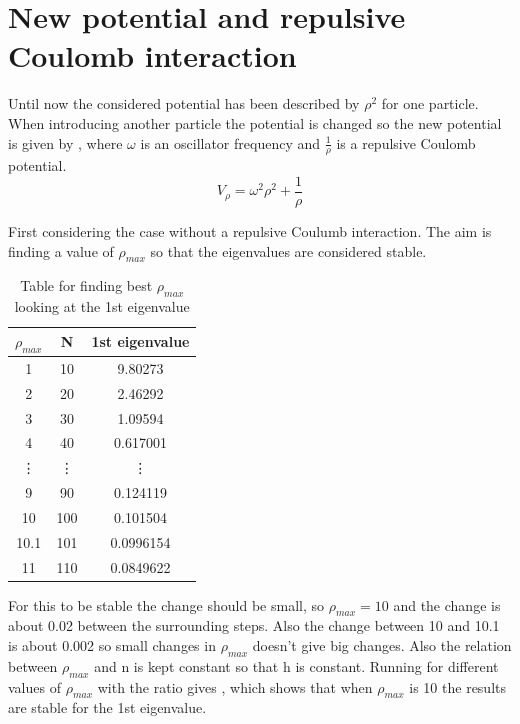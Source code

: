 
\newpage 

\section{New potential and repulsive Coulomb interaction}

Until now the considered potential has been described by $\rho^2$ for one particle. When introducing another particle the potential is changed so the new potential is given by , where $\omega$ is an oscillator frequency and $\frac{1}{\rho}$ is a repulsive Coulomb potential.
\begin{equation}
V_{\rho} = \omega^2\rho^2 + \frac{1}{\rho}
\label{eq:Newpotential}
\end{equation}

First considering the case without a repulsive Coulumb interaction. The aim is finding a value of $\rho_{max}$ so that the eigenvalues are considered stable.  
\begin{table}
\caption{Table for finding best $\rho_{max}$ looking at the 1st eigenvalue} 
\label{tab:rhomax}
\phantom{.}
\begin{tabular}{|c|c|c|}
\hline
$\rho_{max}$ & N & 1st eigenvalue \\
\hline 
1 & 10 & 9.80273 \\
2 & 20 & 2.46292 \\
3 & 30 & 1.09594 \\
4 & 40 & 0.617001 \\
\vdots & \vdots & \vdots \\
9 & 90 & 0.124119\\
10 & 100 & 0.101504 \\
10.1 & 101 & 0.0996154 \\
11 & 110 & 0.0849622 \\
\hline

\end{tabular}

\end{table}
For this to be stable the change should be small, so $\rho_{max} = 10$ and the change is about 0.02 between the surrounding steps. Also the change between 10 and 10.1 is about 0.002 so small changes in $\rho_{max} $ doesn't give big changes. Also the relation between $\rho_{max}$ and n is kept constant so that h is constant. Running for different values of $\rho_{max}$ with the ratio gives , which shows that when $\rho_{max} $ is 10 the results are stable for the 1st eigenvalue. 


